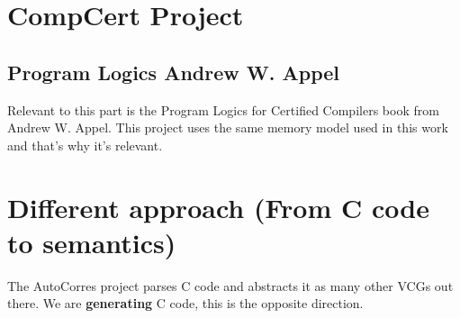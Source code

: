 \begin{comment}
Norrish has a formalized C semantics in HOL, our semantics is also formalized in HOL.

Works that have as a goal to formalize some part of the semantics of the C programming language are covered by Norrish's thesis in his related work section.

Also work formalizing the semantics of Java-like languages or subsets of Java are abundant.
Even though it is also formalizing semantic definitions we find it not directly relatable to our work.
\end{comment}

\section{CompCert Project}

\subsection{Program Logics Andrew W. Appel}

Relevant to this part is the Program Logics for Certified Compilers book from Andrew W. Appel.
This project uses the same memory model used in this work and that's why it's relevant.

\section{Different approach (From C code to semantics)}

The AutoCorres project parses C code and abstracts it as many other VCGs out there.
We are \textbf{generating} C code, this is the opposite direction.
